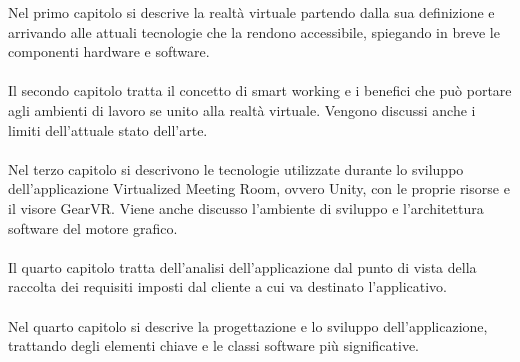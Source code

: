 Nel primo capitolo si descrive la realtà virtuale partendo dalla sua definizione e arrivando alle attuali tecnologie che la rendono accessibile, spiegando in breve le componenti hardware e software.\\
\\
Il secondo capitolo tratta il concetto di smart working e i benefici che può portare agli ambienti di lavoro se unito alla realtà virtuale. Vengono discussi anche i limiti dell'attuale stato dell'arte.\\
\\
Nel terzo capitolo si descrivono le tecnologie utilizzate durante lo sviluppo dell'applicazione Virtualized Meeting Room, ovvero Unity, con le proprie risorse e il visore GearVR. Viene anche discusso l'ambiente di sviluppo e l'architettura software del motore grafico.\\
\\
Il quarto capitolo tratta dell'analisi dell'applicazione dal punto di vista della raccolta dei requisiti imposti dal cliente a cui va destinato l'applicativo.\\
\\
Nel quarto capitolo si descrive la progettazione e lo sviluppo dell'applicazione, trattando degli elementi chiave e le classi software più significative.  


